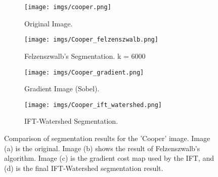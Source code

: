 \documentclass{sbc2023}
\begin{document}
    \begin{figure}[H]
    \centering
        \begin{subfigure}[b]{0.15\textwidth}
            \texttt{[image: imgs/cooper.png]}
            \caption{Original Image.}
            \label{fig:cooper_original}
        \end{subfigure}
    \hfill
        \begin{subfigure}[b]{0.14\textwidth}
            \texttt{[image: imgs/Cooper\_felzenszwalb.png]}
            \caption{Felzenszwalb's Segmentation. k = 6000}
            \label{fig:cooper_felzenszwalb}
        \end{subfigure}
    \hfill
        \begin{subfigure}[b]{0.15\textwidth}
            \texttt{[image: imgs/Cooper\_gradient.png]}
            \caption{Gradient Image (Sobel).}
            \label{fig:cooper_gradient}
        \end{subfigure}
    \hfill
        \begin{subfigure}[b]{0.14\textwidth}
            \texttt{[image: imgs/Cooper\_ift\_watershed.png]}
            \caption{IFT-Watershed Segmentation.}
            \label{fig:cooper_ift}
        \end{subfigure}
    \caption{Comparison of segmentation results for the 'Cooper' image. Image (a) is the original. Image (b) shows the result of Felzenszwalb's algorithm. Image (c) is the gradient cost map used by the IFT, and (d) is the final IFT-Watershed segmentation result.}
    \label{fig:segmentation_comparison_cooper}
    \end{figure}
\end{document}
